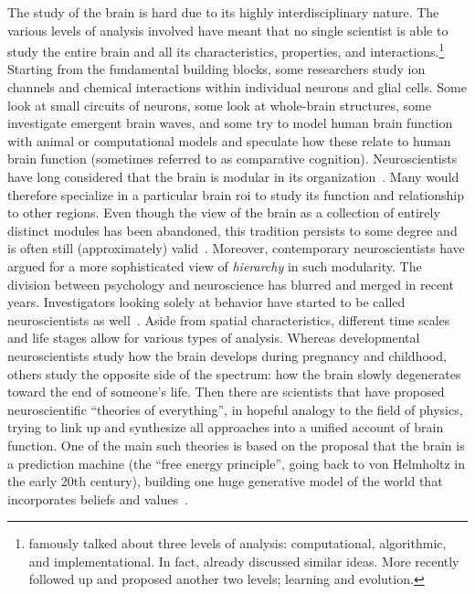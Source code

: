 The study of the brain is hard due to its highly interdisciplinary nature.
The various levels of analysis involved have meant that no single scientist is able to study the entire brain and all its characteristics, properties, and interactions.\footnote{\textcite{Marr1982} famously talked about three levels of analysis: computational, algorithmic, and implementational. In fact, \textcite{Marr1976} already discussed similar ideas. More recently \textcite{Poggio2012} followed up and proposed another two levels; learning and evolution.}
%
Starting from the fundamental building blocks, some researchers study ion channels and chemical interactions within individual neurons and glial cells.
Some look at small circuits of neurons, some look at whole-brain structures, some investigate emergent brain waves, and some try to model human brain function with animal or computational models and speculate how these relate to human brain function (sometimes referred to as comparative cognition).
Neuroscientists have long considered that the brain is modular in its organization~\parencite{Prinz2006}.
Many would therefore specialize in a particular brain \gls{roi} to study its function and relationship to other regions.
Even though the view of the brain as a collection of entirely distinct modules has been abandoned, this tradition persists to some degree and is often still (approximately) valid~\parencite{Genon2018}.
Moreover, contemporary neuroscientists have argued for a more sophisticated view of \emph{hierarchy} in such modularity.
%
The division between psychology and neuroscience has blurred and merged in recent years.
Investigators looking solely at behavior have started to be called neuroscientists as well~\parencite{Niv2021}.
%
Aside from spatial characteristics, different time scales and life stages allow for various types of analysis.
Whereas developmental neuroscientists study how the brain develops during pregnancy and childhood, others study the opposite side of the spectrum: how the brain slowly degenerates toward the end of someone's life.
%
Then there are scientists that have proposed neuroscientific ``theories of everything'', in hopeful analogy to the field of physics, trying to link up and synthesize all approaches into a unified account of brain function.
One of the main such theories is based on the proposal that the brain is a prediction machine (the ``free energy principle'', going back to von Helmholtz in the early 20th century), building one huge generative model of the world that incorporates beliefs and values~\parencite{Friston2010, Gershman2019}.
